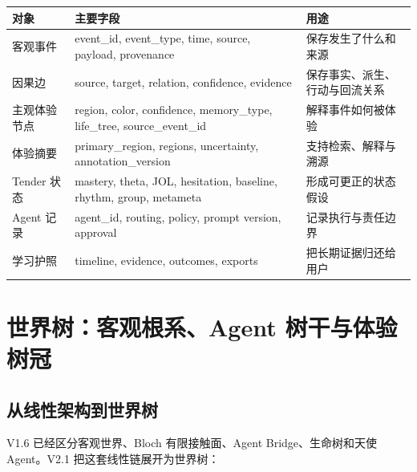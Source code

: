 \documentclass[UTF8,a4paper,11pt]{ctexart}
\begin{document}
\begin{center}
\begin{longtable}{@{}p{3.6cm}p{5.0cm}p{5.9cm}@{}}
\toprule
\textbf{对象} & \textbf{主要字段} & \textbf{用途} \\
\midrule
客观事件 & event\_id, event\_type, time, source, payload, provenance & 保存发生了什么和来源 \\
因果边 & source, target, relation, confidence, evidence & 保存事实、派生、行动与回流关系 \\
主观体验节点 & region, color, confidence, memory\_type, life\_tree, source\_event\_id & 解释事件如何被体验 \\
体验摘要 & primary\_region, regions, uncertainty, annotation\_version & 支持检索、解释与溯源 \\
Tender 状态 & mastery, theta, JOL, hesitation, baseline, rhythm, group, metameta & 形成可更正的状态假设 \\
Agent 记录 & agent\_id, routing, policy, prompt version, approval & 记录执行与责任边界 \\
学习护照 & timeline, evidence, outcomes, exports & 把长期证据归还给用户 \\
\bottomrule
\end{longtable}
\end{center}

\newpage
\section{世界树：客观根系、Agent 树干与体验树冠}

\subsection{从线性架构到世界树}

V1.6 已经区分客观世界、Bloch 有限接触面、Agent Bridge、生命树和天使 Agent。V2.1 把这套线性链展开为世界树：
\end{document}
